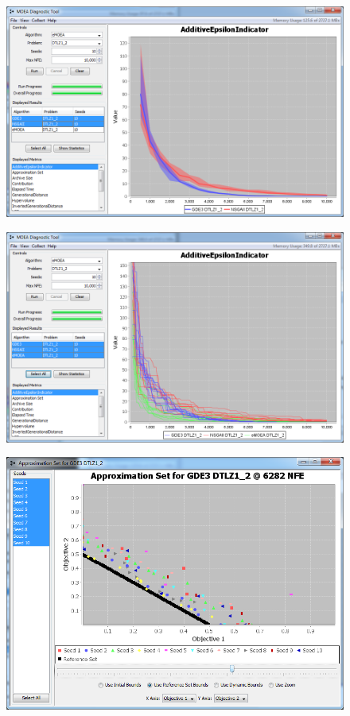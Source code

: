 \begin{figure}[h]
  \includegraphics[width=\linewidth]{diagnosticToolDownselect.png}
\end{figure}

\begin{figure}[h]
  \includegraphics[width=\linewidth]{diagnosticToolTraces.png}
\end{figure}

\begin{figure}[h]
  \includegraphics[width=\linewidth]{approximationSetViewer.png}
\end{figure}

